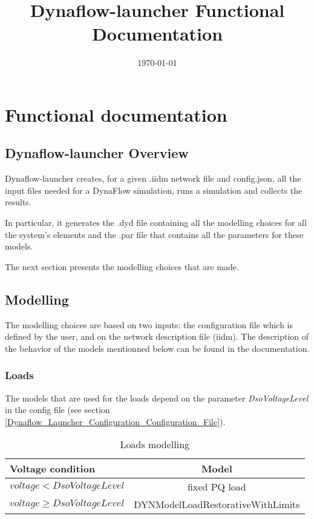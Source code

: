\documentclass[a4paper, 12pt]{report}
\begin{document}
\title{Dynaflow-launcher Functional Documentation}
\date\today

\maketitle
\tableofcontents

\chapter{Functional documentation}

\section[Dynaflow-launcher Overview]{Dynaflow-launcher Overview}
Dynaflow-launcher creates, for a given .iidm network file and config.json, all the input files needed for a DynaFlow simulation, runs a simulation and collects the results.
\par In particular, it generates the .dyd file containing all the modelling choices for all the system's elements and the .par file that contains all the parameters for these models.
\par The next section presents the modelling choices that are made.

\section{Modelling}

The modelling choices are based on two inputs: the configuration file which is defined by the user, and on the network description file (iidm).
The description of the behavior of the models mentionned below can be found in the \Dynawo documentation.

\subsection{Loads}

The models that are used for the loads depend on the parameter \textit{DsoVoltageLevel} in the config file (see section \ref{Dynaflow_Launcher_Configuration_Configuration_File}).
\begin{table}[h!]
\center
\begin{tabular}{ l | c }
\toprule
\textbf{{Voltage condition}} & \textbf{{Model}}\\
\midrule
 $voltage < DsoVoltageLevel$ &  fixed PQ load \\
 $voltage \geq DsoVoltageLevel$ &  DYNModelLoadRestorativeWithLimits \\
\bottomrule
\end{tabular}
\caption{Loads modelling}
\end{table}
\end{document}
